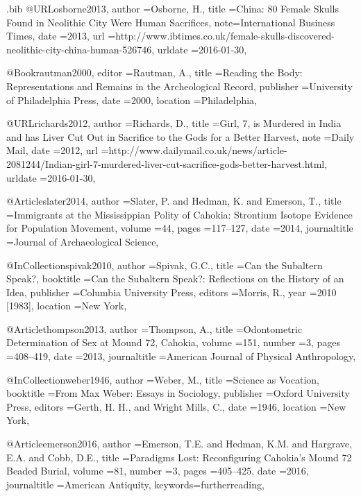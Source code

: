 \begin{filecontents}{\IJSRAidentifier.bib}
@URL{osborne2013,
	author   ={Osborne, H.},
	title    ={China: 80 Female Skulls Found in Neolithic City Were Human Sacrifices},
	note={International Business Times},
	date     ={2013},
	url      ={http://www.ibtimes.co.uk/female-skulls-discovered-neolithic-city-china-human-526746},
	urldate  ={2016-01-30},
}

@Book{rautman2000,
	editor       ={Rautman, A.},
	title        ={Reading the Body: Representations and Remains in the Archeological Record},
	publisher    ={University of Philadelphia Press},
	date         ={2000},
	location     ={Philadelphia},
}

@URL{richards2012,
	author    ={Richards, D.},
	title     ={Girl, 7, is Murdered in India and has Liver Cut Out in Sacrifice to the Gods for a Better Harvest},
	note ={Daily Mail},
	date      ={2012},
	url       ={http://www.dailymail.co.uk/news/article-2081244/Indian-girl-7-murdered-liver-cut-sacrifice-gods-better-harvest.html},
	urldate   ={2016-01-30},
	}

@Article{slater2014,
	author       ={Slater, P. and Hedman, K. and Emerson, T.},
	title        ={Immigrants at the Mississippian Polity of Cahokia: Strontium Isotope Evidence for Population Movement},
	volume       ={44},
	pages        ={117--127},
	date         ={2014},
	journaltitle ={Journal of Archaeological Science},
}

@InCollection{spivak2010,
	author       ={Spivak, G.C.},
	title        ={Can the Subaltern Speak?},
	booktitle    ={Can the Subaltern Speak?: Reflections on the History of an Idea},
	publisher    ={Columbia University Press},
	editors      ={Morris, R.},
	year         ={2010 [1983]},
	location     ={New York},
}

@Article{thompson2013,
	author       ={Thompson, A.},
	title        ={Odontometric Determination of Sex at Mound 72, Cahokia},
	volume       ={151},
	number       ={3},
	pages        ={408--419},
	date         ={2013},
	journaltitle ={American Journal of Physical Anthropology},
}

@InCollection{weber1946,
	author       ={Weber, M.},
	title        ={Science as Vocation},
	booktitle    ={From Max Weber: Essays in Sociology},
	publisher    ={Oxford University Press},
	editors      ={Gerth, H. H., and Wright Mills, C.},
	date         ={1946},
	location     ={New York},
}

@Article{emerson2016,
	author       ={Emerson, T.E. and Hedman, K.M. and Hargrave, E.A. and Cobb, D.E.},
	title        ={Paradigms Lost: Reconfiguring Cahokia's Mound 72 Beaded Burial},
	volume       ={81},
	number       ={3},
	pages        ={405--425},
	date         ={2016},
	journaltitle ={American Antiquity},
	keywords={furtherreading},
}


\end{filecontents}
